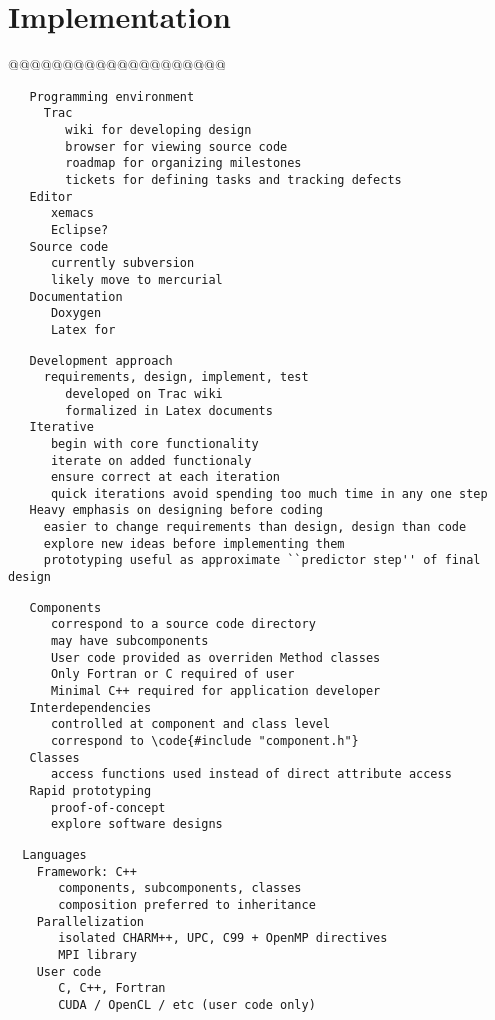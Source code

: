 \documentclass{article}
\begin{document}
\section{Implementation} \label{s:implementation}

@@@@@@@@@@@@@@@@@@@@


\begin{verbatim}
   Programming environment
     Trac
        wiki for developing design
        browser for viewing source code
        roadmap for organizing milestones
        tickets for defining tasks and tracking defects
   Editor
      xemacs
      Eclipse?
   Source code     
      currently subversion
      likely move to mercurial
   Documentation
      Doxygen
      Latex for 
\end{verbatim}

\begin{verbatim}
   Development approach
     requirements, design, implement, test
        developed on Trac wiki
        formalized in Latex documents
   Iterative
      begin with core functionality
      iterate on added functionaly
      ensure correct at each iteration
      quick iterations avoid spending too much time in any one step
   Heavy emphasis on designing before coding
     easier to change requirements than design, design than code
     explore new ideas before implementing them
     prototyping useful as approximate ``predictor step'' of final design
\end{verbatim}

\begin{verbatim}
   Components
      correspond to a source code directory
      may have subcomponents
      User code provided as overriden Method classes
      Only Fortran or C required of user
      Minimal C++ required for application developer
   Interdependencies  
      controlled at component and class level
      correspond to \code{#include "component.h"}
   Classes
      access functions used instead of direct attribute access
   Rapid prototyping
      proof-of-concept
      explore software designs
\end{verbatim}

\begin{verbatim}
  Languages
    Framework: C++
       components, subcomponents, classes
       composition preferred to inheritance
    Parallelization
       isolated CHARM++, UPC, C99 + OpenMP directives
       MPI library
    User code
       C, C++, Fortran 
       CUDA / OpenCL / etc (user code only)
\end{verbatim}
\end{document}

